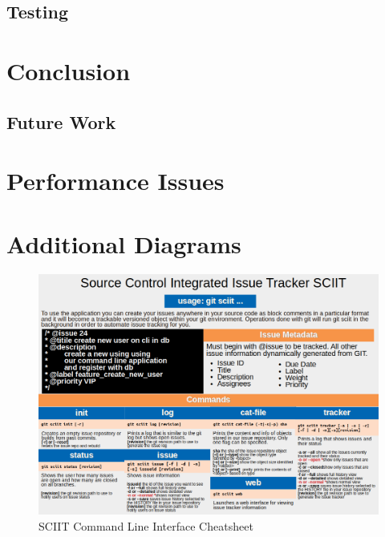\documentclass{mproj}
\begin{document}
\section{Testing}


\chapter{Conclusion}\label{conclusion}

\section{Future Work}

\appendix %
\chapter{Performance Issues}


\chapter{Additional Diagrams}
\begin{figure}[h!]
\caption{SCIIT Command Line Interface Cheatsheet}
\label{fig:sciit-cheatsheet}
\centering
\includegraphics[width=16cm]{Cheatsheet}
\end{figure}


\end{document}
